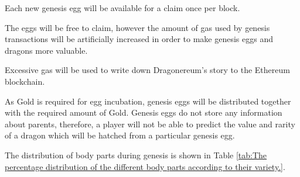 \documentclass[12pt]{article}
\begin{document}
Each new genesis egg will be available for a claim once per block.\par

The eggs will be free to claim, however the amount of gas used by genesis transactions will be artificially increased in order to make genesis eggs and dragons more valuable.\par

Excessive gas will be used to write down Dragonereum’s story to the Ethereum blockchain.\par

As Gold is required for egg incubation, genesis eggs will be distributed together with the required amount of Gold. Genesis eggs do not store any information about parents, therefore, a player will not be able to predict the value and rarity of a dragon which will be hatched from a particular genesis egg.\par

The distribution of body parts during genesis is shown in  Table \ref{tab:The percentage distribution of the different body parts according to their variety.}.\par




\end{document}
